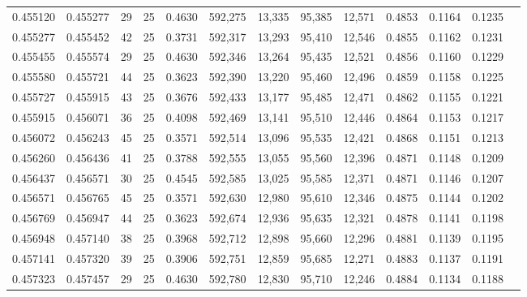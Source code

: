 \begin{tabular}{rrrrrrrrrrrrr}
0.455120 & 0.455277 &    29 &  25 &                                     0.4630 & 592,275 &  13,335 &  95,385 &  12,571 & 0.4853 & 0.1164 & 0.1235 \\
0.455277 & 0.455452 &    42 &  25 &                                     0.3731 & 592,317 &  13,293 &  95,410 &  12,546 & 0.4855 & 0.1162 & 0.1231 \\
0.455455 & 0.455574 &    29 &  25 &                                     0.4630 & 592,346 &  13,264 &  95,435 &  12,521 & 0.4856 & 0.1160 & 0.1229 \\
0.455580 & 0.455721 &    44 &  25 &                                     0.3623 & 592,390 &  13,220 &  95,460 &  12,496 & 0.4859 & 0.1158 & 0.1225 \\
0.455727 & 0.455915 &    43 &  25 &                                     0.3676 & 592,433 &  13,177 &  95,485 &  12,471 & 0.4862 & 0.1155 & 0.1221 \\
0.455915 & 0.456071 &    36 &  25 &                                     0.4098 & 592,469 &  13,141 &  95,510 &  12,446 & 0.4864 & 0.1153 & 0.1217 \\
0.456072 & 0.456243 &    45 &  25 &                                     0.3571 & 592,514 &  13,096 &  95,535 &  12,421 & 0.4868 & 0.1151 & 0.1213 \\
0.456260 & 0.456436 &    41 &  25 &                                     0.3788 & 592,555 &  13,055 &  95,560 &  12,396 & 0.4871 & 0.1148 & 0.1209 \\
0.456437 & 0.456571 &    30 &  25 &                                     0.4545 & 592,585 &  13,025 &  95,585 &  12,371 & 0.4871 & 0.1146 & 0.1207 \\
0.456571 & 0.456765 &    45 &  25 &                                     0.3571 & 592,630 &  12,980 &  95,610 &  12,346 & 0.4875 & 0.1144 & 0.1202 \\
0.456769 & 0.456947 &    44 &  25 &                                     0.3623 & 592,674 &  12,936 &  95,635 &  12,321 & 0.4878 & 0.1141 & 0.1198 \\
0.456948 & 0.457140 &    38 &  25 &                                     0.3968 & 592,712 &  12,898 &  95,660 &  12,296 & 0.4881 & 0.1139 & 0.1195 \\
0.457141 & 0.457320 &    39 &  25 &                                     0.3906 & 592,751 &  12,859 &  95,685 &  12,271 & 0.4883 & 0.1137 & 0.1191 \\
0.457323 & 0.457457 &    29 &  25 &                                     0.4630 & 592,780 &  12,830 &  95,710 &  12,246 & 0.4884 & 0.1134 & 0.1188 \\

\end{tabular}
